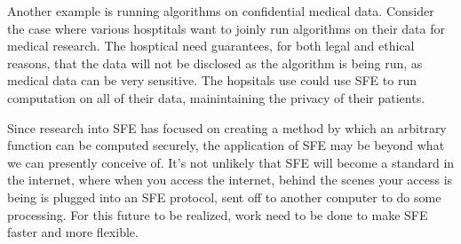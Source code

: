 Another example is running algorithms on confidential medical data. 
Consider the case where various hosptitals want to joinly run algorithms on their data for medical research.
The hosptical need guarantees, for both legal and ethical reasons, that the data will not be disclosed as the algorithm is being run, as medical data can be very sensitive. 
The hopsitals use could use SFE to run computation on all of their data, mainintaining the privacy of their patients.

Since research into SFE has focused on creating a method by which an arbitrary function can be computed securely, the application of SFE may be beyond what we can presently conceive of. 
It's not unlikely that SFE will become a standard in the internet, where when you access the internet, behind the scenes your access is being is plugged into an SFE protocol, sent off to another computer to do some processing. 
For this future to be realized, work need to be done to make SFE faster and more flexible.


